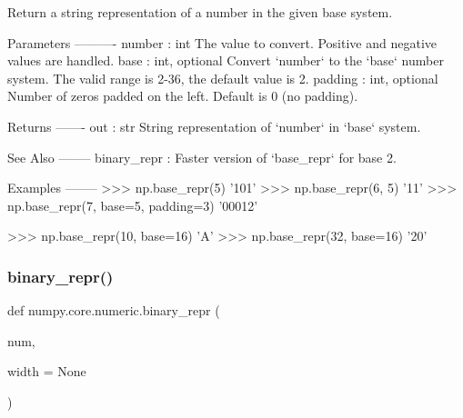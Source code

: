 \begin{DoxyVerb}Return a string representation of a number in the given base system.

Parameters
----------
number : int
    The value to convert. Positive and negative values are handled.
base : int, optional
    Convert `number` to the `base` number system. The valid range is 2-36,
    the default value is 2.
padding : int, optional
    Number of zeros padded on the left. Default is 0 (no padding).

Returns
-------
out : str
    String representation of `number` in `base` system.

See Also
--------
binary_repr : Faster version of `base_repr` for base 2.

Examples
--------
>>> np.base_repr(5)
'101'
>>> np.base_repr(6, 5)
'11'
>>> np.base_repr(7, base=5, padding=3)
'00012'

>>> np.base_repr(10, base=16)
'A'
>>> np.base_repr(32, base=16)
'20'\end{DoxyVerb}
 \mbox{\label{namespacenumpy_1_1core_1_1numeric_a496f8030a53d8ffbaee3639b18116428}} 
\subsubsection{\texorpdfstring{binary\+\_\+repr()}{binary\_repr()}}
{\footnotesize\ttfamily def numpy.\+core.\+numeric.\+binary\+\_\+repr (\begin{DoxyParamCaption}\item[{}]{num,  }\item[{}]{width = {\ttfamily None} }\end{DoxyParamCaption})}


